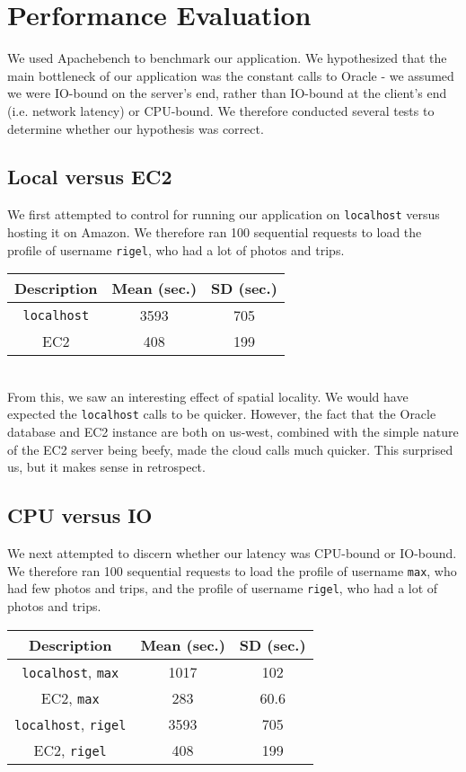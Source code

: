 \documentclass[11pt]{amsart}
\begin{document}
\section{Performance Evaluation}
We used Apachebench to benchmark our application. We hypothesized that the main bottleneck of our
application was the constant calls to Oracle - we assumed we were IO-bound on the server's end,
rather than IO-bound at the client's end (i.e. network latency) or CPU-bound. We therefore conducted
several tests to determine whether our hypothesis was correct.

\subsection{Local versus EC2}
We first attempted to control for running our application on {\tt localhost} versus hosting it on
Amazon. We therefore ran 100 sequential requests to load the profile of username {\tt rigel},
who had a lot of photos and trips. \\

\begin{tabular}{|c|c|c|}
  \hline {\bf Description} & {\bf Mean (sec.)} & {\bf SD (sec.)} \\
  \hline {\tt localhost} & 3593 & 705 \\
  \hline EC2 & 408 & 199 \\
  \hline
\end{tabular} \\

From this, we saw an interesting effect of spatial locality. We would have expected the
{\tt localhost} calls to be quicker. However, the fact that the Oracle database and EC2 instance
are both on us-west, combined with the simple nature of the EC2 server being beefy, made the
cloud calls much quicker. This surprised us, but it makes sense in retrospect.

\subsection{CPU versus IO}
We next attempted to discern whether our latency was CPU-bound or IO-bound. We therefore ran 100 
sequential requests to load the profile of username {\tt max}, who had few photos and trips, and the profile of username {\tt rigel}, who had a lot of photos and trips. \\

\begin{tabular}{|c|c|c|}
  \hline {\bf Description} & {\bf Mean (sec.)} & {\bf SD (sec.)} \\
  \hline {\tt localhost}, {\tt max} & 1017 & 102 \\
  \hline EC2, {\tt max} & 283 & 60.6 \\
  \hline {\tt localhost}, {\tt rigel} & 3593 & 705 \\
  \hline EC2, {\tt rigel} & 408 & 199 \\
  \hline
\end{tabular} \\
\end{document}
